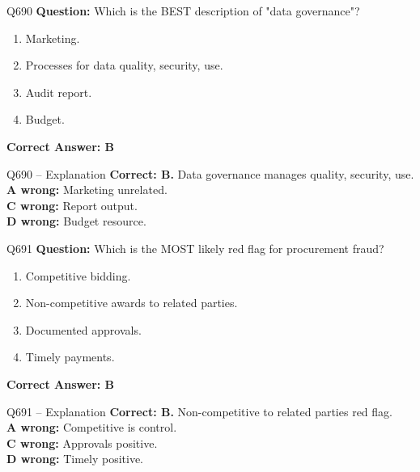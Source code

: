 \documentclass[aspectratio=169,10pt]{beamer}
\begin{document}
	\begin{frame}[t]{Q690}
		\small
		\textbf{Question:} Which is the BEST description of "data governance"?
		\begin{enumerate}[label=\Alph*.,itemsep=1pt,topsep=2pt]
			\item Marketing.
			\item Processes for data quality, security, use.
			\item Audit report.
			\item Budget.
		\end{enumerate}
		\vspace{4pt}
		\textbf{Correct Answer: B}
	\end{frame}
	
	\begin{frame}[t]{Q690 -- Explanation}
		\small
		\textbf{Correct: B.} Data governance manages quality, security, use. \\[4pt]
		\textbf{A wrong:} Marketing unrelated. \\[2pt]
		\textbf{C wrong:} Report output. \\[2pt]
		\textbf{D wrong:} Budget resource.
	\end{frame}
	
	\begin{frame}[t]{Q691}
		\small
		\textbf{Question:} Which is the MOST likely red flag for procurement fraud?
		\begin{enumerate}[label=\Alph*.,itemsep=1pt,topsep=2pt]
			\item Competitive bidding.
			\item Non-competitive awards to related parties.
			\item Documented approvals.
			\item Timely payments.
		\end{enumerate}
		\vspace{4pt}
		\textbf{Correct Answer: B}
	\end{frame}
	
	\begin{frame}[t]{Q691 -- Explanation}
		\small
		\textbf{Correct: B.} Non-competitive to related parties red flag. \\[4pt]
		\textbf{A wrong:} Competitive is control. \\[2pt]
		\textbf{C wrong:} Approvals positive. \\[2pt]
		\textbf{D wrong:} Timely positive.
	\end{frame}
	
\end{document}
